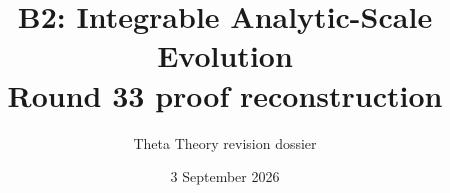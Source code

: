 \documentclass[11pt]{article}
\title{B2: Integrable Analytic-Scale Evolution\\\large Round 33 proof reconstruction}
\author{Theta Theory revision dossier}
\date{3 September 2026}
\begin{document}
\maketitle
\reviewnote

\end{document}
